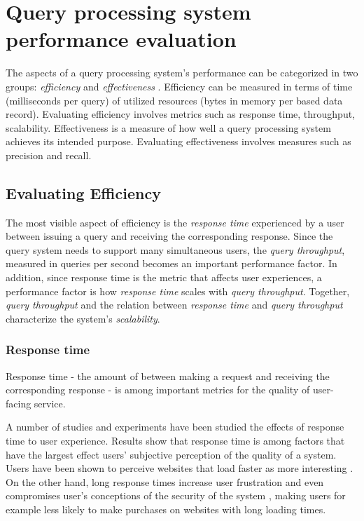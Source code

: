 \section{Query processing system performance evaluation}
\label{sec:requirements}

The aspects of a query processing system's performance can be categorized in two groups:
\textit{efficiency} and \textit{effectiveness} \cite{buttcher:informationretrieval}.
Efficiency can be measured in terms of time (milliseconds per query) of utilized resources (bytes in memory per based
data record).
Evaluating efficiency involves metrics such as response time, throughput, scalability.
Effectiveness is a measure of how well a query processing system achieves its intended purpose.
Evaluating effectiveness involves measures such as precision and recall.

\subsection{Evaluating Efficiency}

The most visible aspect of efficiency is the \textit{response time} experienced by a user between issuing a query and
receiving the corresponding response.
Since the query system needs to support many simultaneous users, the \textit{query throughput}, measured in queries per
second becomes an important performance factor.
In addition, since response time is the metric that affects user experiences, a performance factor is how
\textit{response time} scales with \textit{query throughput}.
Together, \textit{query throughput} and the relation between \textit{response time} and \textit{query throughput}
characterize the system's \textit{scalability}.

\subsubsection{Response time}
Response time - the amount of between making a request and receiving the corresponding response -
is among important metrics for the quality of user-facing service.

A number of studies and experiments have been studied the effects of response time to user experience.
Results show that response time is among factors that have the largest effect users' subjective perception of the
quality of a system.
Users have been shown to perceive websites that load faster as more interesting \cite{ramsay/retrievaltimesinvestigation}.
On the other hand, long response times increase user frustration \cite{ceaparu:userfrustration} and even compromises
user's conceptions of the security of the system \cite{bouch:qualityeyebeholder}, making users for example less likely to
make purchases on websites with long loading times.

